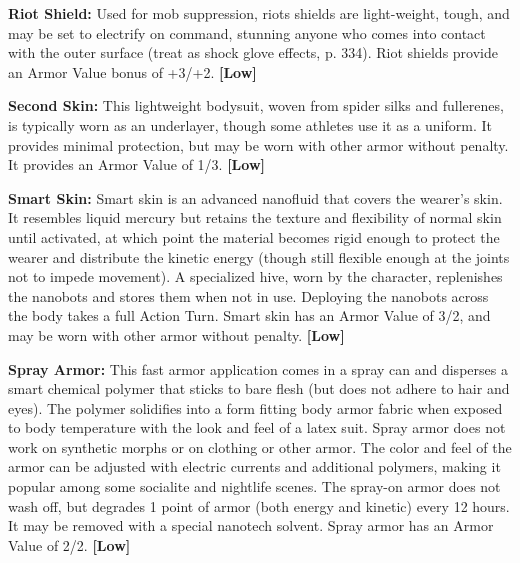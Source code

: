 \textbf{Riot Shield:} Used for mob suppression, riots shields are light-weight, tough, and may be set to electrify on command, stunning anyone who comes into contact with the outer surface (treat as shock glove effects, p. 334). Riot shields provide an Armor Value bonus of +3/+2. \textbf{[Low]} 

\textbf{Second Skin:} This lightweight bodysuit, woven from spider silks and fullerenes, is typically worn as an underlayer, though some athletes use it as a uniform. It provides minimal protection, but may be worn with other armor without penalty. It provides an Armor Value of 1/3. \textbf{[Low]} 

\textbf{Smart Skin:} Smart skin is an advanced nanofluid that covers the wearer’s skin. It resembles liquid mercury but retains the texture and flexibility of normal skin until activated, at which point the material becomes rigid enough to protect the wearer and distribute the kinetic energy (though still flexible enough at the joints not to impede movement). A specialized hive, worn by the character, replenishes the nanobots and stores them when not in use. Deploying the nanobots across the body takes a full Action Turn. Smart skin has an Armor Value of 3/2, and may be worn with other armor without penalty. \textbf{[Low]} 

\textbf{Spray Armor:} This fast armor application comes in a spray can and disperses a smart chemical polymer that sticks to bare flesh (but does not adhere to hair and eyes). The polymer solidifies into a form fitting body armor fabric when exposed to body temperature with the look and feel of a latex suit. Spray armor does not work on synthetic morphs or on clothing or other armor. The color and feel of the armor can be adjusted with electric currents and additional polymers, making it popular among some socialite and nightlife scenes. The spray-on armor does not wash off, but degrades 1 point of armor (both energy and kinetic) every 12 hours. It may be removed with a special nanotech solvent. Spray armor has an Armor Value of 2/2. \textbf{[Low]} 

